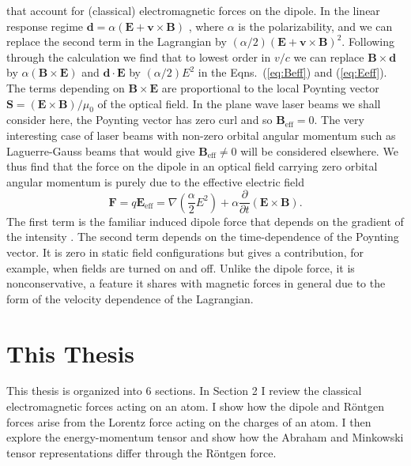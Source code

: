 that account for (classical) electromagnetic forces on the dipole. In the linear response regime $\mathbf{d}=\alpha (\mathbf{E}+ \mathbf{v}\times \mathbf{B})$ \cite{wei95}, where $\alpha$ is the polarizability, and we can replace the second term in the Lagrangian by $(\alpha/2) (\mathbf{E}+ \mathbf{v}\times \mathbf{B})^2$. Following through the calculation we find that to lowest order in $v/c$ we can replace $\mathbf{B} \times \mathbf{d}$ by $\alpha (\mathbf{B} \times \mathbf{E})$ and $\mathbf{d} \cdot \mathbf{E}$ by $(\alpha/2) E^2$ in the Eqns.\ (\ref{eq:Beff}) and (\ref{eq:Eeff}). The terms depending on $\mathbf{B} \times \mathbf{E}$ are proportional to the local Poynting vector $\mathbf{S}=(\mathbf{E} \times \mathbf{B})/\mu_{0}$ of the optical field. In the plane wave laser beams we shall consider here, the Poynting vector has zero curl and so $\mathbf{B}_{\mathrm{eff}} =0$. The very interesting case of laser beams with non-zero orbital angular momentum such as Laguerre-Gauss beams that would give  $\mathbf{B}_{\mathrm{eff}} \neq 0$ will be considered elsewhere. We thus find that the force on the dipole in an optical field carrying zero orbital angular momentum is purely due to the effective electric field
\begin{equation}
\mathbf{F}=q \mathbf{E}_{\mathrm{eff}}= \nabla \left( \frac{\alpha}{2} E^2 \right)+\alpha \frac{\partial}{\partial t} (\mathbf{E} \times \mathbf{B}).
\end{equation}
The first term is the familiar induced dipole force that depends on the gradient of the intensity \cite{cohentannoudjibook}. The second term depends on the time-dependence of the Poynting vector. It is zero in static field configurations but gives a contribution, for example, when fields are turned on and off. Unlike the dipole force, it is nonconservative, a feature it shares with magnetic forces in general due to the form of the velocity dependence of the Lagrangian.
\newpage




\section{This Thesis}

This thesis is organized into 6 sections.  In Section 2 I review the classical electromagnetic forces acting on an atom.  I show how the dipole and R\"{o}ntgen forces arise from the Lorentz force acting on the charges of an atom.  I then explore the energy-momentum tensor and show how the Abraham and Minkowski tensor representations differ through the R\"{o}ntgen force.  

